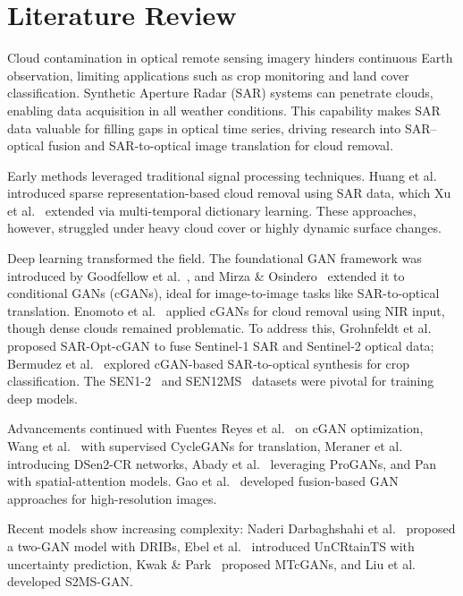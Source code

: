 \chapter{Literature Review}
Cloud contamination in optical remote sensing imagery hinders continuous Earth observation, limiting applications such as crop monitoring and land cover classification. Synthetic Aperture Radar (SAR) systems can penetrate clouds, enabling data acquisition in all weather conditions. This capability makes SAR data valuable for filling gaps in optical time series, driving research into SAR–optical fusion and SAR-to-optical image translation for cloud removal.

Early methods leveraged traditional signal processing techniques. Huang et al.~\cite{huang2015} introduced sparse representation-based cloud removal using SAR data, which Xu et al.~\cite{xu2016} extended via multi-temporal dictionary learning. These approaches, however, struggled under heavy cloud cover or highly dynamic surface changes.

Deep learning transformed the field. The foundational GAN framework was introduced by Goodfellow et al.~\cite{goodfellow2014}, and Mirza \& Osindero~\cite{mirza2014} extended it to conditional GANs (cGANs), ideal for image-to-image tasks like SAR-to-optical translation. Enomoto et al.~\cite{enomoto2017} applied cGANs for cloud removal using NIR input, though dense clouds remained problematic. To address this, Grohnfeldt et al.~\cite{grohnfeldt2018} proposed SAR-Opt-cGAN to fuse Sentinel-1 SAR and Sentinel-2 optical data; Bermudez et al.~\cite{bermudez2018} explored cGAN-based SAR-to-optical synthesis for crop classification. The SEN1-2~\cite{schmitt2018} and SEN12MS~\cite{schmitt2019} datasets were pivotal for training deep models.

Advancements continued with Fuentes Reyes et al.~\cite{fuentes2019} on cGAN optimization, Wang et al.~\cite{wang2019} with supervised CycleGANs for translation, Meraner et al.~\cite{meraner2020} introducing DSen2-CR networks, Abady et al.~\cite{abady2020} leveraging ProGANs, and Pan~\cite{pan2020} with spatial-attention models. Gao et al.~\cite{gao2020} developed fusion-based GAN approaches for high-resolution images.

Recent models show increasing complexity: Naderi Darbaghshahi et al.~\cite{naderi2021} proposed a two-GAN model with DRIBs, Ebel et al.~\cite{ebel2022} introduced UnCRtainTS with uncertainty prediction, Kwak \& Park~\cite{kwak2024} proposed MTcGANs, and Liu et al.~\cite{liu2024} developed S2MS-GAN.

